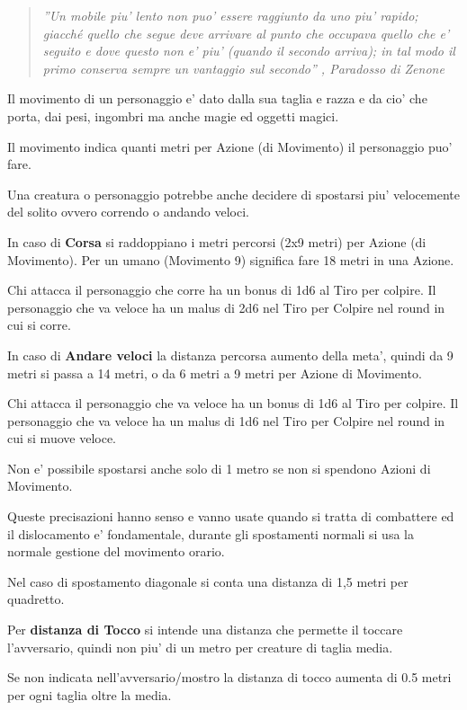 \documentclass[a4paper,11pt,twoside,openany]{book}
\begin{document}
\label{movimento}

\begin{quote}\textit{''Un mobile piu' lento non puo' essere raggiunto da uno piu' rapido; giacché quello che segue deve arrivare al punto che occupava quello che e' seguito e dove questo non e' piu' (quando il secondo arriva); in tal modo il primo conserva sempre un vantaggio sul secondo'' , Paradosso di Zenone
}\end{quote}

Il movimento di un personaggio e' dato dalla sua taglia e razza e da cio' che porta, dai pesi, ingombri ma anche magie ed oggetti magici.

Il movimento indica quanti metri per Azione (di Movimento) il personaggio puo' fare.

Una creatura o personaggio potrebbe anche decidere di spostarsi piu' velocemente del solito ovvero correndo o andando veloci.

In caso di \textbf{Corsa} si raddoppiano i metri percorsi (2x9 metri) per Azione (di Movimento). Per un umano (Movimento 9) significa fare 18 metri in una Azione.

Chi attacca il personaggio che corre ha un bonus di 1d6 al Tiro per colpire. Il personaggio che va veloce ha un malus di 2d6 nel Tiro per Colpire nel round in cui si corre.

In caso di \textbf{Andare veloci} la distanza percorsa aumento della meta', quindi da 9 metri si passa a 14 metri, o da 6 metri a 9 metri per Azione di Movimento.

Chi attacca il personaggio che va veloce ha un bonus di 1d6 al Tiro per colpire. Il personaggio che va veloce ha un malus di 1d6 nel Tiro per Colpire nel round in cui si muove veloce.

Non e' possibile spostarsi anche solo di 1 metro se non si spendono Azioni di Movimento.

Queste precisazioni hanno senso e vanno usate quando si tratta di combattere ed il dislocamento e' fondamentale, durante gli spostamenti normali si usa la normale gestione del movimento orario.

Nel caso di spostamento diagonale si conta una distanza di 1,5 metri per quadretto.

Per \textbf{distanza di Tocco}  si intende una distanza che permette il toccare l'avversario, quindi non piu' di un metro per creature di taglia media.

Se non indicata nell'avversario/mostro la distanza di tocco aumenta di 0.5 metri per ogni taglia oltre la media.
\end{document}
